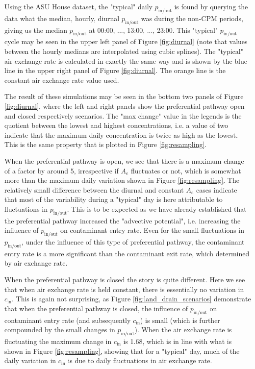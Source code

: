 \documentclass[journal=esthag,manuscript=article]{achemso}
\begin{document}
Using the ASU House dataset, the "typical" daily $p_\mathrm{in/out}$ is found by querying the data what the median, hourly, diurnal $p_\mathrm{in/out}$ was during the non-CPM periods, giving us the median $p_\mathrm{in/out}$ at 00:00, ..., 13:00, ..., 23:00.
This "typical" $p_\mathrm{in/out}$ cycle may be seen in the upper left panel of Figure \ref{fig:diurnal} (note that values between the hourly medians are interpolated using cubic splines).
The "typical" air exchange rate is calculated in exactly the same way and is shown by the blue line in the upper right panel of Figure \ref{fig:diurnal}.
The orange line is the constant air exchange rate value used.\par

The result of these simulations may be seen in the bottom two panels of Figure \ref{fig:diurnal}, where the left and right panels show the preferential pathway open and closed respectively scenarios.
The "max change" value in the legends is the quotient between the lowest and highest concentrations, i.e. a value of two indicate that the maximum daily concentration is twice as high as the lowest.
This is the same property that is plotted in Figure \ref{fig:resampling}.\par

When the preferential pathway is open, we see that there is a maximum change of a factor by around 5, irrespective if $A_e$ fluctuates or not, which is somewhat more than the maximum daily variation shown in Figure \ref{fig:resampling}.
The relatively small difference between the diurnal and constant $A_e$ cases indicate that most of the variability during a "typical" day is here attributable to fluctuations in $p_\mathrm{in/out}$.
This is to be expected as we have already established that the preferential pathway increased the "advective potential", i.e. increasing the influence of $p_\mathrm{in/out}$ on contaminant entry rate.
Even for the small fluctuations in $p_\mathrm{in/out}$, under the influence of this type of preferential pathway, the contaminant entry rate is a more significant than the contaminant exit rate, which determined by air exchange rate.\par

When the preferential pathway is closed the story is quite different.
Here we see that when air exchange rate is held constant, there is essentially no variation in $c_\mathrm{in}$.
This is again not surprising, as Figure \ref{fig:land_drain_scenarios} demonstrate that when the preferential pathway is closed, the influence of $p_\mathrm{in/out}$ on contaminant entry rate (and subsequently $c_\mathrm{in}$) is small (which is further compounded by the small changes in $p_\mathrm{in/out}$).
When the air exchange rate is fluctuating the maximum change in $c_\mathrm{in}$ is 1.68, which is in line with what is shown in Figure \ref{fig:resampling}, showing that for a "typical" day, much of the daily variation in $c_\mathrm{in}$ is due to daily fluctuations in air exchange rate.\par
\end{document}
